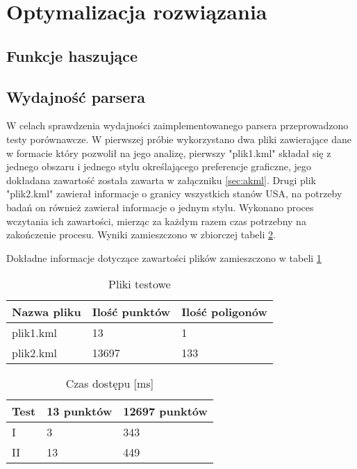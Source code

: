 ﻿\clearpage
\newpage
\section{Optymalizacja rozwiązania}
\label{sec:optymalizacja}

\subsection{Funkcje haszujące}
\label{sec:hashfunction}

\subsection{Wydajność parsera}
\label{subsec:wydajnosc}

W celach sprawdzenia wydajności zaimplementowanego parsera przeprowadzono testy porównawcze. W pierwszej próbie wykorzystano dwa pliki zawierające dane w formacie który pozwolił na jego analizę, pierwszy "plik1.kml" składał się z jednego obszaru i jednego stylu określającego preferencje graficzne, jego dokładana zawartość została zawarta w załączniku \ref{sec:akml}. Drugi plik "plik2.kml" zawierał informacje o granicy wszystkich stanów USA, na potrzeby badań on również zawierał informacje o jednym stylu.
Wykonano proces wczytania ich zawartości, mierząc za każdym razem czas potrzebny na zakończenie procesu. Wyniki zamieszczono w zbiorczej tabeli \ref{tab:speedTest}.

Dokładne informacje dotyczące zawartości plików zamieszczono w tabeli \ref{tab:testFile}

\begin{table}[H]
    \centering
    \begin{tabular}{|l|l|l|}
    \hline
    Nazwa pliku & Ilość punktów & Ilość poligonów \\ \hline
    plik1.kml & 13 & 1 \\ \hline
    plik2.kml & 13697 & 133 \\ \hline

    \end{tabular}
    \caption{Pliki testowe}
    \label{tab:testFile}
\end{table}


\begin{table} [H]
    \centering
    \begin{tabular}{|l|l|l|}
    \hline
    Test & 13 punktów & 12697 punktów \\\hline
    I & 3 & 343 \\\hline
    II & 13 & 449 \\\hline

    \end{tabular}
    \caption{Czas dostępu [ms]}
    \label{tab:speedTest}
\end{table}

